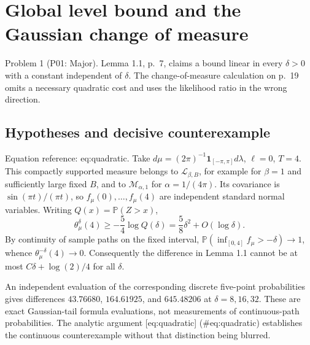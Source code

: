\documentclass[10pt]{article}
\begin{document}
\section*{Global level bound and the Gaussian change of measure}
Problem 1 (P01: Major).  Lemma 1.1, p. 7, claims a bound linear in every \(\delta>0\) with a constant independent of \(\delta\). The change-of-measure calculation on p. 19 omits a necessary quadratic cost and uses the likelihood ratio in the wrong direction.\par
\subsection*{Hypotheses and decisive counterexample}
Equation reference: eq:quadratic. Take \(d\mu=(2\pi)^{-1}\mathbf 1_{[-\pi,\pi]}d\lambda\), \(\ell=0\), \(T=4\). This compactly supported measure belongs to \(\mathcal L_{\beta,B}\), for example for \(\beta=1\) and sufficiently large fixed \(B\), and to \(\mathcal M_{\alpha,1}\) for \(\alpha=1/(4\pi)\). Its covariance is \(\sin(\pi t)/(\pi t)\), so \(f_\mu(0),\ldots,f_\mu(4)\) are independent standard normal variables. Writing \(Q(x)=\mathbb P(Z>x)\), \[\theta_\mu^\delta(4)\ge-\frac54\log Q(\delta)
       =\frac58\delta^2+O(\log\delta).
 \] By continuity of sample paths on the fixed interval, \(\mathbb P(\inf_{[0,4]}f_\mu>-\delta)\to1\), whence \(\theta_\mu^{-\delta}(4)\to0\). Consequently the difference in Lemma 1.1 cannot be at most \(C\delta+\log(2)/4\) for all \(\delta\).\par
An independent evaluation of the corresponding discrete five-point probabilities gives differences \(43.76680\), \(164.61925\), and \(645.48206\) at \(\delta=8,16,32\). These are exact Gaussian-tail formula evaluations, not measurements of continuous-path probabilities. The analytic argument [eq:quadratic] (\#eq:quadratic) establishes the continuous counterexample without that distinction being blurred.\par
\end{document}
